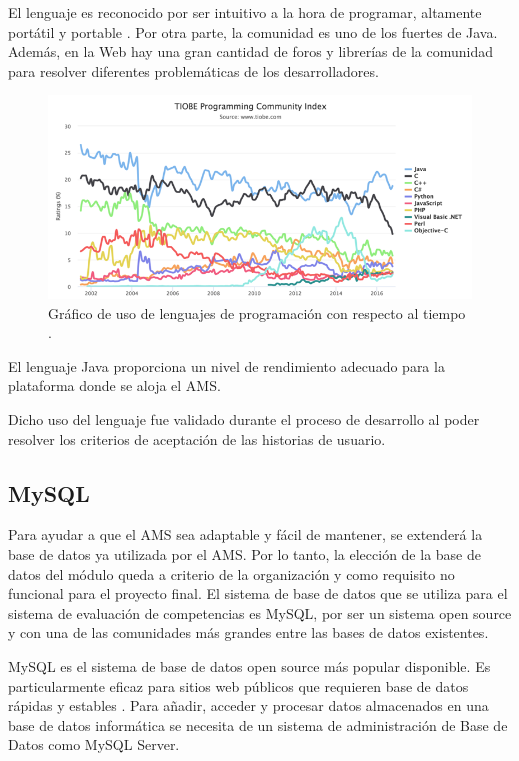 El lenguaje es reconocido por ser intuitivo a la hora de programar, altamente portátil y portable \citep{hunt2011java}. Por otra parte, la comunidad es uno de los fuertes de Java. Además, en la Web hay una gran cantidad de foros y librerías de la comunidad para resolver diferentes problemáticas de los desarrolladores.

\begin{figure}[]
\centering
\includegraphics[width=125mm,scale=1]{Figuras/tecnologias/java}
\caption{Gráfico de uso de lenguajes de programación con respecto al tiempo \citep{tiobe_programming}.}
  \label{graph_java}
\end{figure}

El lenguaje Java proporciona un nivel de rendimiento adecuado para la plataforma donde se aloja el AMS.

Dicho uso del lenguaje fue validado durante el proceso de desarrollo al poder resolver los criterios de aceptación de las historias de usuario.

\subsection{MySQL}
Para ayudar a que el AMS sea adaptable y fácil de mantener, se extenderá la base de datos ya utilizada por el AMS. Por lo tanto, la elección de la base de datos del módulo queda a criterio de la organización y como requisito no funcional para el proyecto final. El sistema de base de datos que se utiliza para el sistema de evaluación de competencias es MySQL, por ser un sistema open source y con una de las comunidades más grandes entre las bases de datos existentes.

MySQL es el sistema de base de datos open source más popular disponible. Es particularmente eficaz para sitios web públicos que requieren base de datos rápidas y estables \citep{dyer2015learning}. Para añadir, acceder y procesar datos almacenados en una base de datos informática se necesita de un sistema de administración de Base de Datos como MySQL Server. 

